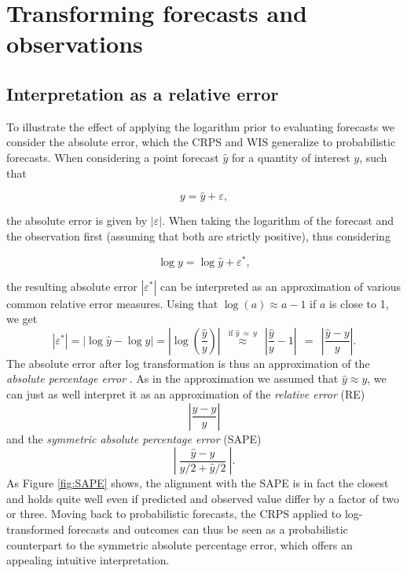 \documentclass{article}
\begin{document}
\section{Transforming forecasts and observations}
\label{sec:methods}

\subsection{Interpretation as a relative error}
\label{sec:methods:relative}

To illustrate the effect of applying the logarithm prior to evaluating forecasts we consider the absolute error, which the CRPS and WIS generalize to probabilistic forecasts. When considering a point forecast $\hat{y}$ for a quantity of interest $y$, such that 
%
\begin{linenomath*}
\begin{equation*}
y = \hat{y} + \varepsilon,
\end{equation*}
\end{linenomath*}
the absolute error is given by $|\varepsilon|$. When taking the logarithm of the forecast and the observation first (assuming that both are strictly positive), thus considering 
\begin{linenomath*}
\begin{equation*}
\log y = \log \hat{y} + \varepsilon^*,
\end{equation*}
\end{linenomath*}
the resulting absolute error $\left|\varepsilon^*\right|$ can be interpreted as an approximation of various common relative error measures. Using that $\log(a) \approx a - 1$ if $a$ is close to 1, we get
$$
|\varepsilon^*| = |\log \hat{y} - \log y| = \left|\log\left(\frac{\hat{y}}{y}\right) \right| \ \ \stackrel{\text{if } \hat{y} \ \approx \ y}{\approx} \ \ \left| \frac{\hat{y}}{y} - 1 \right| \ \ = \ \ \left| \frac{\hat{y} - y}{y} \right|.
$$
The absolute error after log transformation is thus an approximation of the \textit{absolute percentage error} \citep[APE,][]{gneitingMakingEvaluatingPoint2011a}. As in the approximation we assumed that $\hat{y} \approx y$, we can just as well interpret it as an approximation of the \textit{relative error} (RE)
$$
\left| \frac{\hat{y} - y}{\hat{y}} \right|
$$
and the \textit{symmetric absolute percentage error} (SAPE)
$$
\left| \ \frac{\hat{y} - y}{y/2 + \hat{y}/2} \ \right|.
$$
As Figure \ref{fig:SAPE} shows, the alignment with the SAPE is in fact the closest and holds quite well even if predicted and observed value differ by a factor of two or three. Moving back to probabilistic forecasts, the CRPS applied to log-transformed forecasts and outcomes can thus be seen as a probabilistic counterpart to the symmetric absolute percentage error, which offers an appealing intuitive interpretation.
\end{document}
